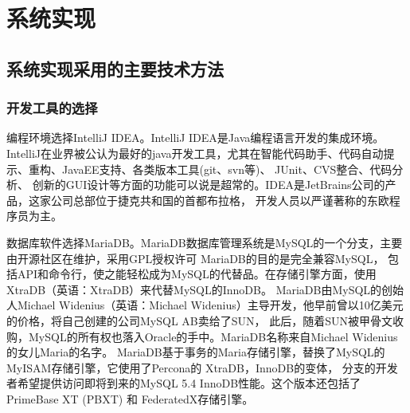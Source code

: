 \chapter{系统实现}

\section{系统实现采用的主要技术方法}
\subsection{开发工具的选择}
编程环境选择IntelliJ IDEA。IntelliJ IDEA是Java编程语言开发的集成环境。
IntelliJ在业界被公认为最好的java开发工具，尤其在智能代码助手、代码自动提示、重构、JavaEE支持、各类版本工具(git、svn等)、
JUnit、CVS整合、代码分析、 创新的GUI设计等方面的功能可以说是超常的。IDEA是JetBrains公司的产品，这家公司总部位于捷克共和国的首都布拉格，
开发人员以严谨著称的东欧程序员为主。
\par
数据库软件选择MariaDB。MariaDB数据库管理系统是MySQL的一个分支，主要由开源社区在维护，采用GPL授权许可 MariaDB的目的是完全兼容MySQL，
包括API和命令行，使之能轻松成为MySQL的代替品。在存储引擎方面，使用XtraDB（英语：XtraDB）来代替MySQL的InnoDB。 
MariaDB由MySQL的创始人Michael Widenius（英语：Michael Widenius）主导开发，他早前曾以10亿美元的价格，将自己创建的公司MySQL AB卖给了SUN，
此后，随着SUN被甲骨文收购，MySQL的所有权也落入Oracle的手中。MariaDB名称来自Michael Widenius的女儿Maria的名字。
MariaDB基于事务的Maria存储引擎，替换了MySQL的MyISAM存储引擎，它使用了Percona的 XtraDB，InnoDB的变体，
分支的开发者希望提供访问即将到来的MySQL 5.4 InnoDB性能。这个版本还包括了 PrimeBase XT (PBXT) 和 FederatedX存储引擎。
